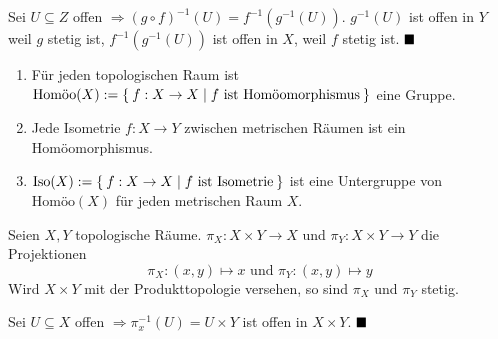 
\begin{beweis}
    Sei $U \subseteq Z$ offen $\Rightarrow (g \circ f)^{-1} (U) = f^{-1} (g^{-1}(U))$.
    $g^{-1}(U)$ ist offen in $Y$ weil $g$ stetig ist, $f^{-1}(g^{-1}(U))$
    ist offen in $X$, weil $f$ stetig ist. $\qed$
\end{beweis}

\begin{bemerkung}
    \begin{enumerate}[label=\alph*)]
        \item Für jeden topologischen Raum ist 
              $\text{Homöo}(X) := \Set{f: X \rightarrow X | f \text{ ist Homöomorphismus}}$
              eine Gruppe.
        \item Jede Isometrie $f:X \rightarrow Y$ zwischen metrischen 
              Räumen ist ein Homöomorphismus.
        \item $\operatorname{Iso}(X) := \Set{f:X \rightarrow X | f \text{ ist Isometrie}}$ ist
              eine Untergruppe von $\text{Homöo}(X)$ für jeden
              metrischen Raum $X$.
    \end{enumerate}
\end{bemerkung}

\begin{korollar}
    Seien $X, Y$ topologische Räume. $\pi_X: X \times Y \rightarrow X$
    und $\pi_Y: X \times Y \rightarrow Y$ die Projektionen 
    \[\pi_X: (x,y) \mapsto x \text{ und } \pi_Y: (x,y) \mapsto y\]
    Wird $X \times Y$ mit der Produkttopologie versehen, so sind $\pi_X$
    und $\pi_Y$ stetig.
\end{korollar}

\begin{beweis}
    Sei $U \subseteq X$ offen $\Rightarrow \pi_x^{-1} (U) = U \times Y$ 
    ist offen in $X \times Y$. $\qed$
\end{beweis}

